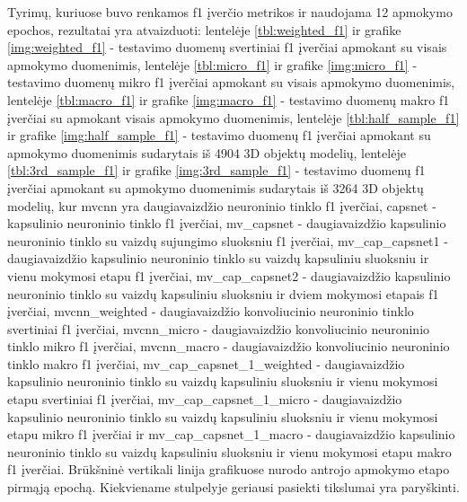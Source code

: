 Tyrimų, kuriuose buvo renkamos f1 įverčio metrikos ir naudojama 12 apmokymo epochos, rezultatai yra atvaizduoti: lentelėje \ref{tbl:weighted_f1} ir grafike \ref{img:weighted_f1} - testavimo duomenų svertiniai f1 įverčiai apmokant su visais apmokymo duomenimis, lentelėje \ref{tbl:micro_f1} ir grafike \ref{img:micro_f1} - testavimo duomenų mikro f1 įverčiai apmokant su visais apmokymo duomenimis, lentelėje \ref{tbl:macro_f1} ir grafike \ref{img:macro_f1} - testavimo duomenų makro f1 įverčiai su apmokant visais apmokymo duomenimis, lentelėje \ref{tbl:half_sample_f1} ir grafike \ref{img:half_sample_f1} - testavimo duomenų f1 įverčiai apmokant su apmokymo duomenimis sudarytais iš 4904 3D objektų modelių, lentelėje \ref{tbl:3rd_sample_f1} ir grafike \ref{img:3rd_sample_f1} - testavimo duomenų f1 įverčiai apmokant su apmokymo duomenimis sudarytais iš 3264 3D objektų modelių, kur
mvcnn yra daugiavaizdžio neuroninio tinklo f1 įverčiai, capsnet - kapsulinio neuroninio tinklo f1 įverčiai, mv\_capsnet - daugiavaizdžio kapsulinio neuroninio tinklo su vaizdų sujungimo sluoksniu f1 įverčiai, mv\_cap\_capsnet1 - daugiavaizdžio kapsulinio neuroninio tinklo su vaizdų kapsuliniu sluoksniu ir vienu mokymosi etapu f1 įverčiai, mv\_cap\_capsnet2 - daugiavaizdžio kapsulinio neuroninio tinklo su vaizdų kapsuliniu sluoksniu ir dviem mokymosi etapais f1 įverčiai, 
mvcnn\_weighted -  daugiavaizdžio konvoliucinio neuroninio tinklo svertiniai f1 įverčiai, 
mvcnn\_micro -  daugiavaizdžio konvoliucinio neuroninio tinklo mikro f1 įverčiai, 
mvcnn\_macro -  daugiavaizdžio konvoliucinio neuroninio tinklo makro f1 įverčiai, 
mv\_cap\_capsnet\_1\_weighted - daugiavaizdžio kapsulinio neuroninio tinklo su vaizdų kapsuliniu sluoksniu ir vienu mokymosi etapu svertiniai f1 įverčiai, 
mv\_cap\_capsnet\_1\_micro - daugiavaizdžio kapsulinio neuroninio tinklo su vaizdų kapsuliniu sluoksniu ir vienu mokymosi etapu mikro f1 įverčiai ir
mv\_cap\_capsnet\_1\_macro - daugiavaizdžio kapsulinio neuroninio tinklo su vaizdų kapsuliniu sluoksniu ir vienu mokymosi etapu makro f1 įverčiai. 
Brūkšninė vertikali linija grafikuose nurodo antrojo apmokymo etapo pirmąją epochą. Kiekviename stulpelyje geriausi pasiekti tikslumai yra paryškinti.

